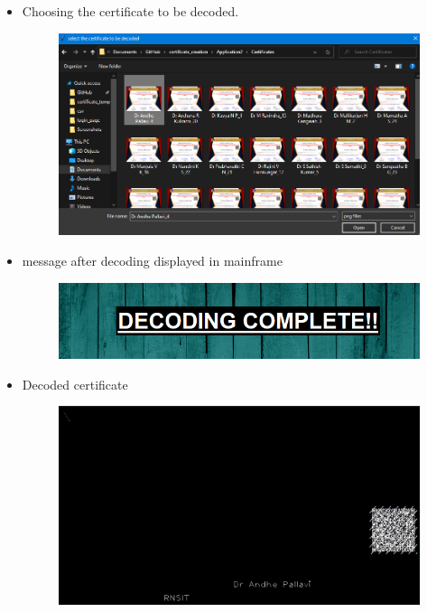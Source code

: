 \begin{itemize}
\newpage 
 	\item Choosing the certificate to be decoded.
\begin{figure}[H]
	\centering
	\includegraphics[width=0.95\linewidth]{"images/generation_qr_nqr/Screenshot (78)"}
	\label{fig:screenshot-78}
\end{figure}

	\item message after decoding displayed in mainframe
\begin{figure}[H]
	\centering
	\includegraphics[width=0.75\linewidth]{"images/generation_qr_nqr/Screenshot (79)"}
	\label{fig:screenshot-79}
\end{figure}



\newpage
	
	\item Decoded certificate

\begin{figure}[H]
	\centering
	\includegraphics[width=0.8\linewidth]{"images/generation_qr_nqr/Screenshot (82)"}
	\label{fig:screenshot-82}
\end{figure}


\end{itemize}
